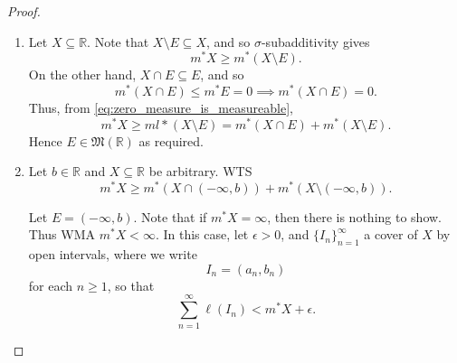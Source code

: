 \documentclass[notoc,notitlepage]{tufte-book}
\begin{document}
\begin{proof}
  \begin{enumerate}
    \item Let $X \subseteq \mathbb{R}$. Note that $X \setminus E \subseteq X$,
      and so $\sigma$-subadditivity gives
      \begin{equation}\label{eq:zero_measure_is_measureable}
        m^* X \geq m^*(X \setminus E).
      \end{equation}
      On the other hand, $X \cap E \subseteq E$, and so
      \begin{equation*}
        m^* (X \cap E) \leq m^* E = 0 \implies m^* (X \cap E) = 0.
      \end{equation*}
      Thus, from \cref{eq:zero_measure_is_measureable},
      \begin{equation*}
        m^* X \geq ml* (X \setminus E) = m^* (X \cap E) + m^* (X \setminus E).
      \end{equation*}
      Hence $E \in \mathfrak{M}(\mathbb{R})$ as required.

    \item Let $b \in \mathbb{R}$ and $X \subseteq \mathbb{R}$ be arbitrary. WTS
      \begin{equation*}
        m^* X \geq m^* ( X \cap (-\infty, b) ) + m^* ( X \setminus (-\infty, b) ).
      \end{equation*}

      Let $E = (-\infty, b)$.  Note that if $m^* X  = \infty$, then there is
      nothing to show. Thus WMA $m^* X < \infty$. In this case, let $\epsilon >
      0$, and $\{ I_n \}_{n=1}^{\infty}$ a cover of $X$ by open intervals, where
      we write
      \begin{equation*}
        I_n = (a_n, b_n)
      \end{equation*}
      for each $n \geq 1$, so that 
      \begin{equation*}
        \sum_{n=1}^{\infty} \ell(I_n) < m^* X + \epsilon.
      \end{equation*}


\end{enumerate}
\end{proof}
\end{document}
